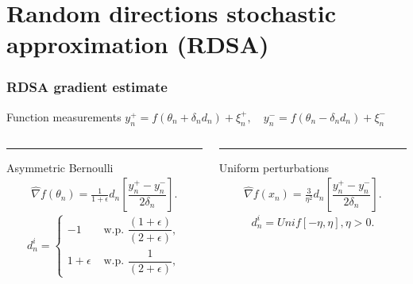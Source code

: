\section{Random directions stochastic approximation (RDSA)}
\begin{frame}
\begin{small}
\frametitle{\centering  RDSA gradient estimate}

\begin{block}{Function measurements}
$y_{n}^+ = f(\theta_n+\delta_n d_n) + \xi_{n}^+,\quad y_{n}^- = f(\theta_n-\delta_n d_n) + \xi_{n}^-$
\end{block}
\begin{block}{}
\begin{columns}[T]
\begin{column}{.48\textwidth}
\color{red}\rule{\linewidth}{4pt}
Asymmetric Bernoulli
\begin{align}
\label{eq:grad-unif}
\widehat\nabla f(\theta_n) = \frac{1}{1+\epsilon} d_n \left[ \dfrac{y_n^+ - y_n^-}{2\delta_n}\right].
\end{align}
\begin{equation}
\label{eq:det-proj}
 d_n^i =
  \begin{cases}
   -1 &  \text{ w.p. } \dfrac{(1+\epsilon)}{(2+\epsilon)}, \\
   1+\epsilon &  \text{ w.p. } \dfrac{1}{(2+\epsilon)},
  \end{cases}
\end{equation}
\end{column}
\begin{column}{.48\textwidth}
\color{blue}\rule{\linewidth}{4pt}
Uniform perturbations
\begin{align}
\label{eq:grad-unif}
\widehat\nabla f(x_n) = \frac3{\eta^2} d_n \left[ \dfrac{y_n^+ - y_n^-}{2\delta_n}\right].
\end{align}
\begin{equation}
\label{eq:det-proj-unif}
 d_n^i = Unif[-\eta,\eta], \eta>0.
 \end{equation}
\end{column}
\end{columns}
\end{block}
\end{small}
\end{frame}


